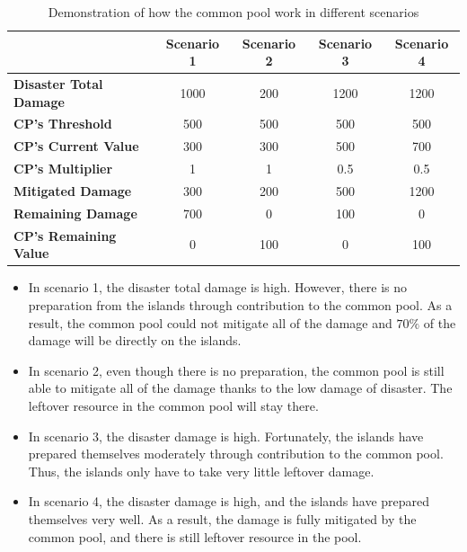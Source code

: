 \begin{table}[!htb]
\begin{center}
\begin{tabular}{|l|c|c|c|c|}
\hline
                               & \textbf{Scenario 1} & \textbf{Scenario 2} & \textbf{Scenario 3} & \textbf{Scenario 4} \\ \hline
\textbf{Disaster Total Damage} & 1000                & 200                 & 1200                & 1200                \\ \hline
\textbf{CP's Threshold}        & 500                 & 500                 & 500                 & 500                 \\ \hline
\textbf{CP's Current Value}    & 300                 & 300                 & 500                 & 700                 \\ \hline
\textbf{CP's Multiplier}       & 1                   & 1                   & 0.5                 & 0.5                 \\ \hline
\textbf{Mitigated Damage}      & 300                 & 200                 & 500                 & 1200                \\ \hline
\textbf{Remaining Damage}      & 700                 & 0                   & 100                 & 0                   \\ \hline
\textbf{CP's Remaining Value}  & 0                   & 100                 & 0                   & 100                 \\ \hline
\end{tabular}
\end{center}
\caption{Demonstration of how the common pool work in different scenarios}
\label{tab:Demonstration of how the common pool work in different scenarios}
\end{table}

\begin{itemize}
    \item In scenario 1, the disaster total damage is high. However, there is no preparation from the islands through contribution to the common pool. As a result, the common pool could not mitigate all of the damage and $70\%$ of the damage will be directly on the islands.
    \item In scenario 2, even though there is no preparation, the common pool is still able to mitigate all of the damage thanks to the low damage of disaster. The leftover resource in the common pool will stay there.
    \item In scenario 3, the disaster damage is high. Fortunately, the islands have prepared themselves moderately through contribution to the common pool. Thus, the islands only have to take very little leftover damage.
    \item In scenario 4, the disaster damage is high, and the islands have prepared themselves very well. As a result, the damage is fully mitigated by the common pool, and there is still leftover resource in the pool. 
\end{itemize}


